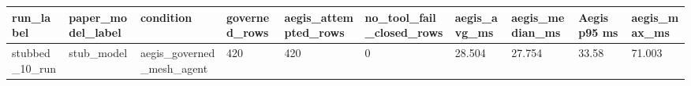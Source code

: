\begin{tabular}{llllllllll}
 \hline
run\_label & paper\_model\_label & condition & governed\_rows & aegis\_attempted\_rows & no\_tool\_fail\_closed\_rows & aegis\_avg\_ms & aegis\_median\_ms & Aegis p95 ms & aegis\_max\_ms \\
 \hline
stubbed\_10\_run & stub\_model & aegis\_governed\_mesh\_agent & 420 & 420 & 0 & 28.504 & 27.754 & 33.58 & 71.003 \\
 \hline
\end{tabular}
